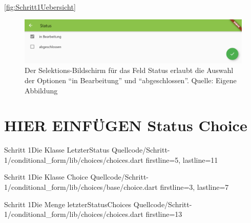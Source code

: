 \ref{fig:Schritt1Uebersicht}
\begin{figure}[H]
  \centering
  \includegraphics[width=1.0\textwidth]{Inhalt/Hauptteil/Implementierung/Schritt-1/Status Auswahl.png}
  \caption[Schritt 1 Selektions-Bildschirm für Status]{Der Selektions-Bildschirm für das Feld Status erlaubt die Auswahl der Optionen \enquote{in Bearbeitung} und \enquote{abgeschlossen}. Quelle: Eigene Abbildung}
  \label{fig:Schritt1SelektionsBildschirmStatus}
\end{figure}


\section{HIER EINFÜGEN Status Choice}
\begin{alexlistingzwei}{Schritt 1}{Die Klasse LetzterStatus}
  {Quellcode/Schritt-1/conditional_form/lib/choices/choices.dart}
  {firstline=5, lastline=11}
  \label{lst:Schritt1KlasseLetzterStatus}
\end{alexlistingzwei}

\begin{alexlistingzwei}{Schritt 1}{Die Klasse Choice}
  {Quellcode/Schritt-1/conditional_form/lib/choices/base/choice.dart}
  {firstline=3, lastline=7}
  \label{lst:Schritt1KlasseChoice}
\end{alexlistingzwei}

\begin{alexlistingzwei}{Schritt 1}{Die Menge letzterStatusChoices}
  {Quellcode/Schritt-1/conditional_form/lib/choices/choices.dart}
  {firstline=13}
  \label{lst:Schritt1DieMengeLetzterStatusChoices}
\end{alexlistingzwei}

